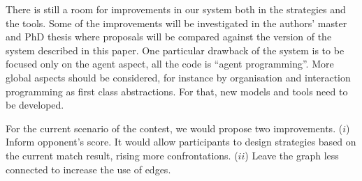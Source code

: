 There is still a room for improvements in our system both in the strategies and the tools. Some of the improvements will be investigated in the authors' master and PhD thesis where proposals will be compared against the version of the system described in this paper. One particular drawback of the system is to be focused only on the agent aspect, all the code is ``agent programming''. More global aspects should be considered, for instance by organisation and interaction programming as first class abstractions. For that, new models and tools need to be developed.

For the current scenario of the contest, we would propose two improvements. ($i$) Inform opponent's score. It would allow participants to design strategies based on the current match result, rising more confrontations. ($ii$) Leave the graph less connected to increase the use of edges.

